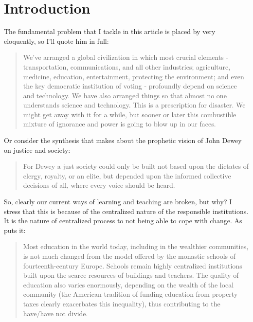 \section{Introduction}

The fundamental problem that I tackle in this article is placed by \cite{sagan_1996__candle_in_dark}  
very eloquently, so I'll quote him in full:

\begin{quotation}
    We've arranged a global civilization in which most crucial elements -
    transportation, communications, and all other industries; agriculture,
    medicine, education, entertainment, protecting the environment; and even
    the key democratic institution of voting - profoundly depend on science and
    technology. We have also arranged things so that almost no one understands
    science and technology. This is a prescription for disaster. We might get
    away with it for a while, but sooner or later this combustible mixture of
    ignorance and power is going to blow up in our faces.
\end{quotation}

Or consider the synthesis that \cite{education:cavallo__models_of_growth} makes
about the prophetic vision of John Dewey on justice and society:

\begin{quote}
    For Dewey a just society could only be built not based upon the dictates of
    clergy, royalty, or an elite, but depended upon the informed collective
    decisions of all, where every voice should be heard.
\end{quote}

So, clearly our current ways of learning and teaching are broken, but why? I
stress that this is because of the centralized nature of the responsible
institutions. It is the nature of centralized process to not being able to cope
with change. As \cite{futurism:kurzweil_singularity_is_near} puts it:

\begin{quotation}
    Most education in the world today, including in the wealthier communities,
    is not much changed from the model offered by the monastic schools of
    fourteenth-century Europe. Schools remain highly centralized institutions
    built upon the scarce resources of buildings and teachers. The quality of
    education also varies enormously, depending on the wealth of the local
    community (the American tradition of funding education from property taxes
    clearly exacerbates this inequality), thus contributing to the have/have not
    divide.
\end{quotation}

